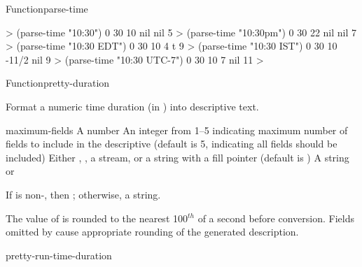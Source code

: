 \documentclass[10pt,twoside,english,pdftex]{article}
\begin{document}
\begin{functiondoc}{Function}{parse-time}{%
    }
\fnexamples
%
\W\supp
\begin{example}
  > (parse-time "10:30")
  0
  30
  10
  nil
  nil
  5\goodpagebreak
  > (parse-time "10:30pm")
  0
  30
  22
  nil
  nil
  7\goodpagebreak
  > (parse-time "10:30 EDT")
  0
  30
  10
  4
  t
  9\goodpagebreak
  > (parse-time "10:30 IST")
  0
  30
  10
 -11/2
  nil
  9\goodpagebreak
  > (parse-time "10:30 UTC-7")
  0
  30
  10
  7
  nil
  11
  >
\end{example}

\end{functiondoc}


\begin{functiondoc}{Function}{pretty-duration}{%
    }
% 

\fnsyntax

\fnpurpose Format a numeric time duration (in ) into
descriptive text.

\fnpackage {}

\fnmodule {}

\fnargs
\begin{args}{maximum-fields}
\arg[seconds] A number
 An integer from 1--5 indicating maximum number of fields 
to include in the descriptive  (default is 5, indicating all 
fields should be included)
\arg[destination] Either \nil, , a stream, or a string with a fill 
pointer (default is \nil)
\arg[result] A string or \nil{}
\end{args}

\fnreturns If  is non-\nil, then \nil; otherwise, a string.

\fndescription The value of  is rounded to the nearest
100$^{th}$ of a second before conversion.  Fields omitted by
 cause appropriate rounding of the generated
description.

\begin{alsos}{pretty-run-time-duration}
\end{alsos}


\end{functiondoc}
\end{document}
